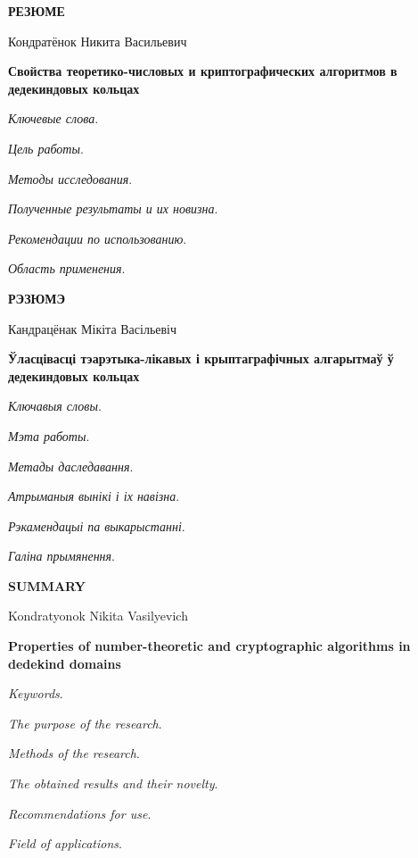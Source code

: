 \documentclass[_00_autoref.tex]{subfiles}
\begin{document}
\newpage
\centerline{\textbf{РЕЗЮМЕ}}

\vspace{-0.3ex}
\begin{center}
Кондратёнок Никита Васильевич

\textbf{Свойства теоретико-числовых и криптографических алгоритмов в дедекиндовых кольцах}
\end{center}
\vspace{-0.3ex}

\textit{Ключевые слова}.

\textit{Цель работы}.

\textit{Методы исследования}.

\textit{Полученные результаты и их новизна}.

\textit{Рекомендации по использованию}.

\textit{Область применения}.

\newpage
\centerline{\textbf{РЭЗЮМЭ}}

\vspace{-0.3ex}
\begin{center}
Кандрацёнак Мікіта Васільевіч

\textbf{Ўласцівасці тэарэтыка-лікавых і крыптаграфічных алгарытмаў ў дедекиндовых кольцах}
\end{center}
\vspace{-0.3ex}

\textit{Ключавыя словы}.

\textit{Мэта работы}.

\textit{Метады даследавання}.

\textit{Атрыманыя вынікі і іх навізна}.

\textit{Рэкамендацыі па выкарыстанні}.

\textit{Галіна прымянення}.

\newpage
\centerline{\textbf{SUMMARY}}

\vspace{-0.3ex}
\begin{center}
Kondratyonok Nikita Vasilyevich

\textbf{Properties of number-theoretic and cryptographic algorithms in dedekind domains}
\end{center}
\vspace{-0.3ex}

\textit{Keywords}.

\textit{The purpose of the research}.

\textit{Methods of the research}.

\textit{The obtained results and their novelty}.

\textit{Recommendations for use}.

\textit{Field of applications}.
\end{document}
